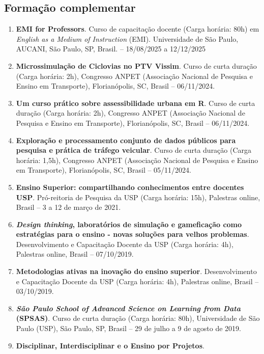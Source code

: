 \documentclass[
  brazilian,
  11pt,
  a4paper,
]{article}
\begin{document}
\subsection{Formação complementar}\label{formauxe7uxe3o-complementar}

\begin{enumerate}
\def\labelenumi{\arabic{enumi}.}
\item
  \textbf{EMI for Professors}. Curso de capacitação docente (Carga
  horária: 80h) em \emph{English as a Medium of Instruction} (EMI).
  Universidade de São Paulo, AUCANI, São Paulo, SP, Brasil. --
  18/08/2025 a 12/12/2025
\item
  \textbf{Microssimulação de Ciclovias no PTV Vissim}. Curso de curta
  duração (Carga horária: 2h), Congresso ANPET (Associação Nacional de
  Pesquisa e Ensino em Transporte), Florianópolis, SC, Brasil --
  06/11/2024.
\item
  \textbf{Um curso prático sobre assessibilidade urbana em R}. Curso de
  curta duração (Carga horária: 2h), Congresso ANPET (Associação
  Nacional de Pesquisa e Ensino em Transporte), Florianópolis, SC,
  Brasil -- 06/11/2024.
\item
  \textbf{Exploração e processamento conjunto de dados públicos para
  pesquisa e prática de tráfego veicular}. Curso de curta duração (Carga
  horária: 1,5h), Congresso ANPET (Associação Nacional de Pesquisa e
  Ensino em Transporte), Florianópolis, SC, Brasil -- 05/11/2024.
\item
  \textbf{Ensino Superior: compartilhando conhecimentos entre docentes
  USP}. Pró-reitoria de Pesquisa da USP (Carga horária: 15h), Palestras
  online, Brasil -- 3 a 12 de março de 2021.
\item
  \textbf{\emph{Design thinking}, laboratórios de simulação e
  gameficação como estratégias para o ensino - novas soluções para
  velhos problemas}. Desenvolvimento e Capacitação Docente da USP (Carga
  horária: 4h), Palestras online, Brasil -- 07/10/2019.
\item
  \textbf{Metodologias ativas na inovação do ensino superior}.
  Desenvolvimento e Capacitação Docente da USP (Carga horária: 4h),
  Palestras online, Brasil -- 03/10/2019.
\item
  \textbf{\emph{São Paulo School of Advanced Science on Learning from
  Data} (SPSAS)}. Curso de curta duração (Carga horária: 80h),
  Universidade de São Paulo (USP), São Paulo, SP, Brasil -- 29 de julho
  a 9 de agosto de 2019.
\item
  \textbf{Disciplinar, Interdisciplinar e o Ensino por Projetos}.

\end{enumerate}
\end{document}
